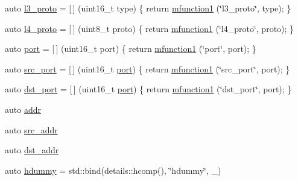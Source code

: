 \begin{DoxyCompactItemize}
auto \hyperlink{namespacepfq__lang_1_1anonymous__namespace_02default_8hpp_03_aed01dd5380a873d92397ec0d4c07abac}{l3\+\_\+proto} = \mbox{[}$\,$\mbox{]} (uint16\+\_\+t type) \{ return \hyperlink{namespacepfq__lang_a3cc9d61411c0398bb46aa2b33a21f7ed}{mfunction1} (\char`\"{}l3\+\_\+proto\char`\"{}, type); \}
\item 
auto \hyperlink{namespacepfq__lang_1_1anonymous__namespace_02default_8hpp_03_a75da77904f1cff4cc42fc3a081f80670}{l4\+\_\+proto} = \mbox{[}$\,$\mbox{]} (uint8\+\_\+t proto) \{ return \hyperlink{namespacepfq__lang_a3cc9d61411c0398bb46aa2b33a21f7ed}{mfunction1} (\char`\"{}l4\+\_\+proto\char`\"{}, proto); \}
\item 
auto \hyperlink{namespacepfq__lang_1_1anonymous__namespace_02default_8hpp_03_a1b370b44e5eedc364f3bb306d5042738}{port} = \mbox{[}$\,$\mbox{]} (uint16\+\_\+t port) \{ return \hyperlink{namespacepfq__lang_a3cc9d61411c0398bb46aa2b33a21f7ed}{mfunction1} (\char`\"{}port\char`\"{}, port); \}
\item 
auto \hyperlink{namespacepfq__lang_1_1anonymous__namespace_02default_8hpp_03_ad4d03d1e69ba9608a2d87ac91a2b521f}{src\+\_\+port} = \mbox{[}$\,$\mbox{]} (uint16\+\_\+t \hyperlink{namespacepfq__lang_1_1anonymous__namespace_02default_8hpp_03_a1b370b44e5eedc364f3bb306d5042738}{port}) \{ return \hyperlink{namespacepfq__lang_a3cc9d61411c0398bb46aa2b33a21f7ed}{mfunction1} (\char`\"{}src\+\_\+port\char`\"{}, port); \}
\item 
auto \hyperlink{namespacepfq__lang_1_1anonymous__namespace_02default_8hpp_03_aceccbe6ec912638fb8d5d3d9e0372a09}{dst\+\_\+port} = \mbox{[}$\,$\mbox{]} (uint16\+\_\+t \hyperlink{namespacepfq__lang_1_1anonymous__namespace_02default_8hpp_03_a1b370b44e5eedc364f3bb306d5042738}{port}) \{ return \hyperlink{namespacepfq__lang_a3cc9d61411c0398bb46aa2b33a21f7ed}{mfunction1} (\char`\"{}dst\+\_\+port\char`\"{}, port); \}
\item 
auto \hyperlink{namespacepfq__lang_1_1anonymous__namespace_02default_8hpp_03_aafce8334d1be83bff9a2115439c8c453}{addr}
\item 
auto \hyperlink{namespacepfq__lang_1_1anonymous__namespace_02default_8hpp_03_a63c87ff605d7cefa807fd61bc463785d}{src\+\_\+addr}
\item 
auto \hyperlink{namespacepfq__lang_1_1anonymous__namespace_02default_8hpp_03_a4b72bac7c3af312ffe7c670eb2583f9a}{dst\+\_\+addr}
\item 
auto \hyperlink{namespacepfq__lang_1_1anonymous__namespace_02default_8hpp_03_a4e7cf4874b42c5722f420fc54f360242}{hdummy} = std\+::bind(details\+::hcomp(), \char`\"{}hdummy\char`\"{}, \+\_)

\end{DoxyCompactItemize}
